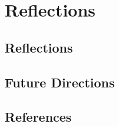 \documentclass[11pt,twocolumn,notitlepage,openany,twoside]{book}
\begin{document}
\chapter{Reflections}
\begin{refsection}

\section{Reflections}

\section{Future Directions}

\section{References}

\printbibliography[heading=none]
\end{refsection}
\end{document}
